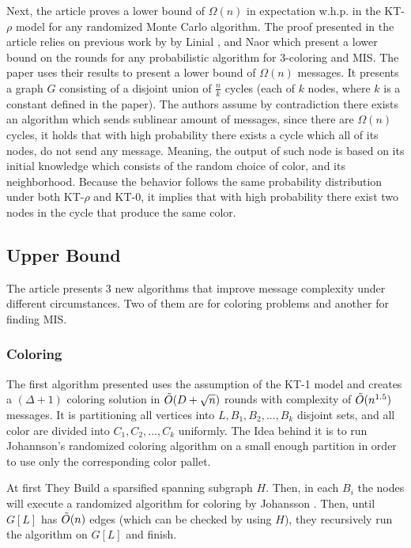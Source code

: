 \documentclass[11pt]{article}
\begin{document}
Next, the article proves a lower bound of $\Omega(n)$ in expectation w.h.p. in the KT-$\rho$ model for any randomized Monte Carlo algorithm.
The proof presented in the article relies on previous work by by Linial \cite{Linial}, and Naor \cite{Naor} which present a lower bound on the rounds for any probabilistic algorithm for 3-coloring and MIS. The paper uses their results to present a lower bound of $\Omega(n)$ messages. It presents a graph $G$ consisting of a disjoint union of $\frac{n}{k}$ cycles (each of $k$ nodes, where $k$ is a constant defined in the paper). The authors assume by contradiction there exists an algorithm which sends sublinear amount of messages, since there are $\Omega(n)$ cycles, it holds that with high probability there exists a cycle which all of its nodes, do not send any message. Meaning, the output of such node is based on its initial knowledge which consists of the random choice of color, and its neighborhood. Because the behavior follows the same probability distribution under both KT-$\rho$ and KT-$0$, it implies that with high probability there exist two nodes in the cycle that produce the same color.

\subsection*{Upper Bound}
The article presents 3 new algorithms that improve message complexity under different circumstances. Two of them are for coloring problems and another for finding MIS.

\subsubsection*{Coloring}

The first algorithm presented uses the assumption of the KT-1 model and creates a $(\Delta+1)$ coloring solution in ${\Tilde{O}}(D+\sqrt{n})$ rounds with complexity of ${\Tilde{O}}(n^{1.5})$ messages. It is partitioning all vertices into $L, B_1, B_2, ..., B_k$ disjoint sets, and all color are divided into $C_1, C_2, ..., C_k$ uniformly. The Idea behind it is to run Johannson's \cite{Johansson} randomized coloring algorithm on a small enough partition in order to use only the corresponding color pallet. 

At first They Build a sparsified spanning subgraph $H$. Then, in each $B_i$ the nodes will execute a randomized algorithm for coloring by Johansson \cite{Johansson}. Then, until $G[L]$ has $\Tilde{O}(n)$ edges (which can be checked by using $H$), they recursively run the algorithm on $G[L]$ and finish.
\end{document}
